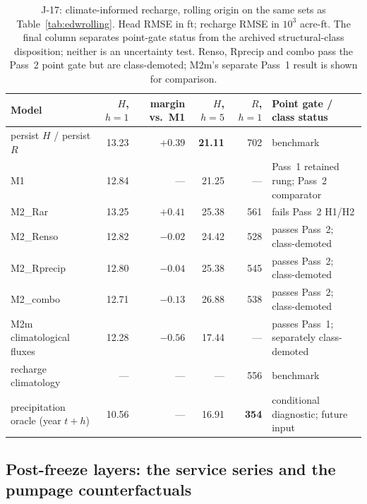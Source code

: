 \begin{table}[!htb]
\centering\scriptsize\setlength{\tabcolsep}{2pt}
\caption{J-17: climate-informed recharge, rolling origin on the same sets as Table~\ref{tab:edwrolling}. Head RMSE in ft; recharge RMSE in $10^3$ acre-ft. The final column separates point-gate status from the archived structural-class disposition; neither is an uncertainty test. Renso, Rprecip and combo pass the Pass~2 point gate but are class-demoted; M2m's separate Pass~1 result is shown for comparison.}
\label{tab:edwclimate}
\begin{tabularx}{\textwidth}{@{}>{\raggedright\arraybackslash}p{}rrrr>{\raggedright\arraybackslash}X@{}}
\toprule
Model & $H$, $h{=}1$ & margin vs.\ M1 & $H$, $h{=}5$ & $R$, $h{=}1$ & Point gate / class status \\
\midrule
persist $H$ / persist $R$ & 13.23 & $+0.39$ & \textbf{21.11} & 702 & benchmark \\
M1 & 12.84 & --- & 21.25 & --- & Pass~1 retained rung; Pass~2 comparator \\
M2\_Rar & 13.25 & $+0.41$ & 25.38 & 561 & fails Pass~2 H1/H2 \\
M2\_Renso & 12.82 & $-0.02$ & 24.42 & 528 & passes Pass~2; class-demoted \\
M2\_Rprecip & 12.80 & $-0.04$ & 25.38 & 545 & passes Pass~2; class-demoted \\
M2\_combo & 12.71 & $-0.13$ & 26.88 & 538 & passes Pass~2; class-demoted \\
M2m climatological fluxes & 12.28 & $-0.56$ & 17.44 & --- & passes Pass~1; separately class-demoted \\
recharge climatology & --- & --- & --- & 556 & benchmark \\
precipitation oracle (year $t{+}h$) & 10.56 & --- & 16.91 & \textbf{354} & conditional diagnostic; future input \\
\bottomrule
\end{tabularx}
\end{table}

\subsection{Post-freeze layers: the service series and the pumpage counterfactuals}\label{sec:edw_post}

